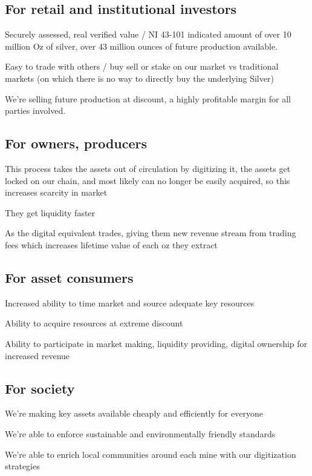\documentclass[11pt]{article}
\begin{document}
\subsection{For retail and institutional investors}

Securely assessed, real verified value / NI 43-101 indicated amount of over 10 million Oz of silver, over 43 million ounces of future production available.


Easy to trade with others / buy sell or stake on our market vs traditional markets (on which there is no way to directly buy the underlying Silver)


We're selling future production at discount, a highly profitable margin for all parties involved.


\subsection{For owners, producers}

This process takes the assets out of circulation by digitizing it, the assets get locked on our chain, and most likely can no longer be easily acquired, so this increases scarcity in market


They get liquidity faster


As the digital equivalent trades, giving them new revenue stream from trading fees which increases lifetime value of each oz they extract


\subsection{For asset consumers}

Increased ability to time market and source adequate key resources


Ability to acquire resources at extreme discount


Ability to participate in market making, liquidity providing, digital ownership for increased revenue


\subsection{For society}

We're making key assets available cheaply and efficiently for everyone


We're able to enforce sustainable and environmentally friendly standards


We're able to enrich local communities around each mine with our digitization strategies
\end{document}
